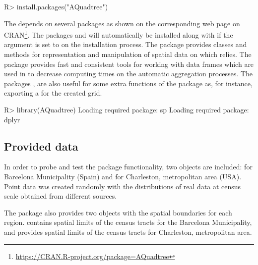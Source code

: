 \begin{example*}
R> install.packages("AQuadtree")
\end{example*}

The  depends on several  packages as shown on the corresponding web page on CRAN\footnote{\url{https://CRAN.R-project.org/package=AQuadtree}}. The packages  \citep{Pebesma2005, Bivand2013} and  \citep{Wickham2015} will automatically be installed along with  if the  argument is set to  on the installation process. The  package provides classes and methods for representation and manipulation of spatial data on which  relies. The  package provides fast and consistent tools for working with data frames which are used in  to decrease computing times on the automatic aggregation processes. The packages  \citep{Bivand2017},  \citep{Bivand2016} are also useful for some extra functions of the package as, for instance, exporting a  for the created grid.
%
\begin{example*}
R> library(AQuadtree)
Loading required package: sp
Loading required package: dplyr
\end{example*}
%


\subsection{Provided data} \label{sec:data}

In order to probe and test the package functionality, two  objects are included:  for Barcelona Municipality (Spain) and  for  Charleston, metropolitan area (USA). Point data was created randomly with the distributions of real data at census scale obtained from different sources.

The package also provides two  objects with the spatial boundaries for each region.  contains spatial limits of the census tracts for the Barcelona Municipality, and  provides spatial limits of the census tracts for Charleston, metropolitan area.


